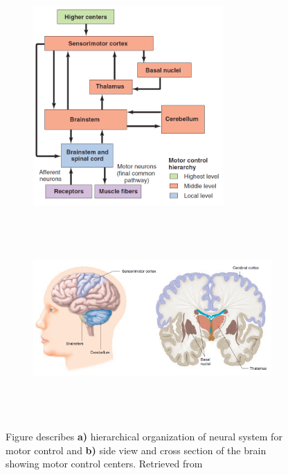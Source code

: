 \begin{figure}[t!]
    \centering
    \begin{subfigure}[t]{0.95\textwidth}
        \centering
        \includegraphics[height=3in]{Images/introduction/control.png}
        \caption{}
    \end{subfigure}%
    
    \begin{subfigure}[t]{0.95\textwidth}
        \centering
        \includegraphics[height=3in]{Images/introduction/control2.png}
        \caption{}
    \end{subfigure}
    \caption{Figure describes \textbf{a)} hierarchical organization of neural system for motor control and \textbf{b)} side view and cross section of the brain showing motor control centers. Retrieved from \citep{Widmaier2014}}
\label{fig:brain_centers}
\end{figure}

